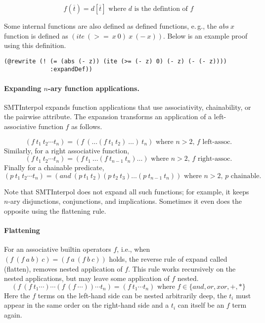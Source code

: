 \documentclass[a4paper]{article}
\newcommand\si{SMTInterpol\xspace}
\begin{document}
\begin{equation}
f(\overline{t}) = d[\overline{t}]
\text{ where $d$ is the defintion of $f$} \tag{expandDef}
\end{equation}

Some internal functions are also defined as defined functions,
e.\,g., the $abs\ x$ function is defined as $(ite\ (>=\ x\ 0)\ x\ (-\ x))$. Below is an example proof using this definition.
\begin{verbatim}
(@rewrite (! (= (abs (- z)) (ite (>= (- z) 0) (- z) (- (- z))))
             :expandDef))
\end{verbatim}

\paragraph{Expanding $n$-ary function applications.}  \si expands function
applications that use associativity, chainability, or the pairwise attribute.
The expansion transforms an application of a left-associative function $f$ as follows.

\begin{equation*}
  (f\ t_1\ t_2 \cdots t_n) = (f\ (\ldots (f\ t_1\ t_2)\ \ldots)\ t_n)
  \text{ where $n > 2$, $f$ left-assoc.}
  \tag{expand}
\end{equation*}
Similarly, for a right associative function,
\begin{equation*}
  (f\ t_1\ t_2 \cdots t_n) = (f\ t_1\ \ldots (f\ t_{n-1}\ t_n)\ldots)
  \text{ where $n > 2$, $f$ right-assoc.}
  \tag{expand}
\end{equation*}
Finally for a chainable predicate,
\begin{equation*}
  (p\ t_1\ t_2 \cdots t_n) = (and\ (p\ t_1\ t_2) (p\ t_2\ t_3) \ldots (p\ t_{n-1}\ t_n))
  \text{ where $n > 2$, $p$ chainable.}
  \tag{expand}
\end{equation*}

Note that \si does not expand all such functions; for example, it
keeps $n$-ary disjunctions, conjunctions, and implications.  Sometimes
it even does the opposite using the flattening rule.

\paragraph{Flattening}
For an associative builtin operators $f$, i.e., when $(f\ (f\ a\ b)\ c) =
(f\ a\ (f\ b\ c))$ holds, the reverse rule of expand called (flatten),
removes nested application of $f$.  This rule works recursively on the
nested applications, but may leave some application of $f$ nested.
\begin{equation}
  (f\ (f\ t_1 \cdots) \cdots (f\ (f\ \cdots)) \cdots t_n) = (f\ t_1\cdots t_n)
  \text{ where $f \in \{and,or,xor,+,*\}$}
  \tag{flatten}
\end{equation}
Here the $f$ terms on the left-hand side can be nested arbitrarily
deep, the $t_i$ must appear in the same order on the right-hand side
and a $t_i$ can itself be an $f$ term again.
\end{document}
